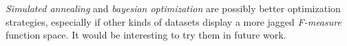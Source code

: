 \textit{Simulated annealing} and \textit{bayesian optimization} are possibly better optimization strategies, especially if other kinds of datasets display a more jagged \textit{F-measure} function space. It would be interesting to try them in future work.











%
%

